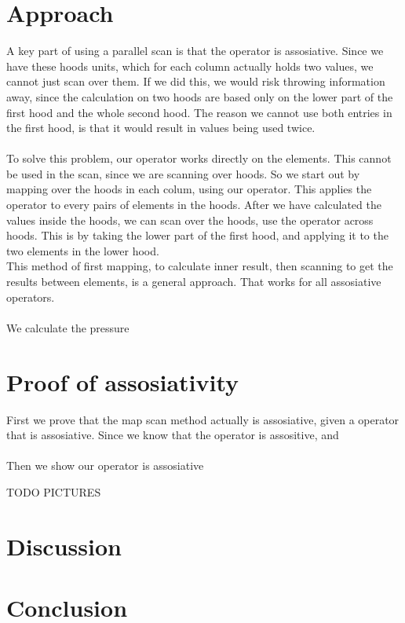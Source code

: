 \documentclass[11pt]{report}
\begin{document}
\section{Approach}
A key part of using a parallel scan is that the operator is assosiative. Since we have these hoods units, which for each column actually holds two values, we cannot just scan over them. If we did this, we would risk throwing information away, since the calculation on two hoods are based only on the lower part of the first hood and the whole second hood. The reason we cannot use both entries in the first hood, is that it would result in values being used twice.
\\
\\
To solve this problem, our operator works directly on the elements. This cannot be used in the scan, since we are scanning over hoods. So we start out by mapping over the hoods in each colum, using our operator. This applies the operator to every pairs of elements in the hoods. After we have calculated the values inside the hoods, we can scan over the hoods, use the operator across hoods. This is by taking the lower part of the first hood, and applying it to the two elements in the lower hood.
\\

This method of first mapping, to calculate inner result, then scanning to get the results between elements, is a general approach. That works for all assosiative operators.
\\
\\
We calculate the pressure

\section{Proof of assosiativity}

First we prove that the map scan method actually is assosiative, given a operator that is assosiative. Since we know that the operator is assositive, and
\\
\\
Then we show our operator is assosiative

TODO PICTURES

\section{Discussion}

\section{Conclusion}
\end{document}
